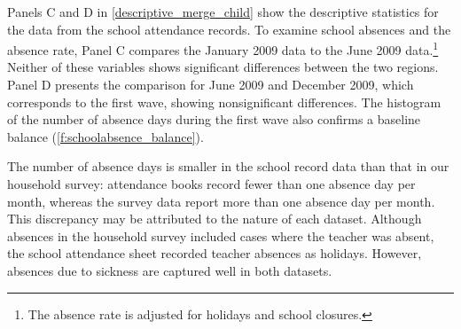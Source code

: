 \documentclass[fleqn,11pt]{article}
\begin{document}
Panels C and D in \autoref{descriptive_merge_child} show the descriptive statistics for the data from the school attendance records. To examine  school absences and the absence rate, Panel C compares the January 2009 data to the June 2009 data.\footnote{The absence rate is adjusted for holidays and school closures.} Neither of these variables shows significant differences between the two regions. Panel D presents the comparison for June 2009 and December 2009, which corresponds to the first wave, showing nonsignificant differences. The histogram of the number of absence days during the first wave also confirms a baseline balance (\autoref{f:schoolabsence_balance}).

The number of absence days is smaller in the school record data than that in our household survey: attendance books record fewer than one absence day per month, whereas the survey data report more than one absence day per month. This discrepancy may be attributed to the nature of each dataset. Although absences in the household survey included cases where the teacher was absent, the school attendance sheet recorded teacher absences as holidays. However, absences due to sickness are captured well in both datasets.




\end{document}
